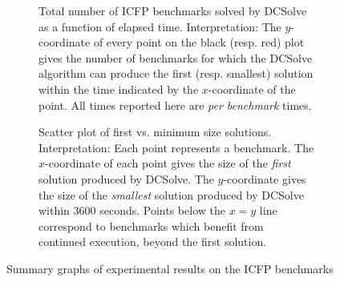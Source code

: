 \documentclass{llncs}
\newcommand{\dcsolve}{{\sffamily\fontsize{8.5}{10}\selectfont
    DCSolve}\xspace}
\begin{document}
\begin{figure}[!t]
\centering
\begin{subfigure}{0.45\textwidth}
  \caption{Total number of ICFP benchmarks solved by \dcsolve as a
    function of elapsed
    time. Interpretation: The $y$-coordinate of every point on the
    black (resp. red) plot gives the number of benchmarks for which
    the \dcsolve algorithm can produce the first (resp. smallest)
    solution within the time indicated by the $x$-coordinate of the
    point. All times reported here are \emph{per benchmark} times.}
  \label{subfigure:solved_vs_time}
\end{subfigure}
\quad
\begin{subfigure}{0.45\textwidth}
  \caption{Scatter plot of first vs. minimum size
    solutions. Interpretation: Each point represents a benchmark. The
    $x$-coordinate of each point gives the size of the \emph{first}
    solution produced by \dcsolve. The $y$-coordinate gives the size
    of the \emph{smallest} solution produced by \dcsolve within 3600
    seconds. Points below the $x = y$ line correspond to benchmarks
    which benefit from continued execution, beyond the first solution.}
  \label{subfigure:first_vs_best}
\end{subfigure}
\caption{Summary graphs of experimental results on the ICFP benchmarks}
\end{figure}
\end{document}

